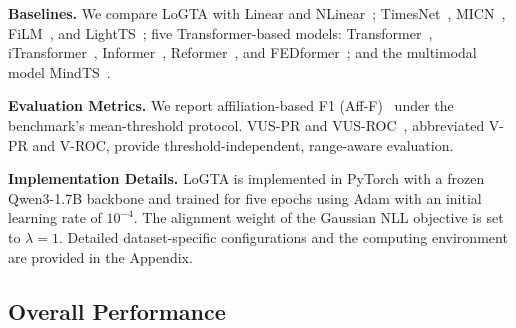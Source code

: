 \documentclass[letterpaper]{article} %
\newcommand{\method}{LoGTA}
\begin{document}
\noindent\textbf{Baselines.}
We compare \method{} with Linear and NLinear~\cite{zeng2023transformers}; TimesNet~\cite{wu2022timesnet}, MICN~\cite{wang2023micn}, FiLM~\cite{zhou2022film}, and LightTS~\cite{zhang2022morefastmultivariatetime}; five Transformer-based models: Transformer~\cite{vaswani2017attention}, iTransformer~\cite{liu2024itransformer}, Informer~\cite{zhou2021informer}, Reformer~\cite{kitaev2020reformer}, and FEDformer~\cite{zhou2022fedformer}; and the multimodal model MindTS~\cite{hu2026towards}.





\noindent\textbf{Evaluation Metrics.}
We report affiliation-based F1 (Aff-F)~\cite{huet2022local} under the benchmark's mean-threshold protocol. VUS-PR and VUS-ROC~\cite{paparrizos2022volume}, abbreviated V-PR and V-ROC, provide threshold-independent, range-aware evaluation.

\noindent\textbf{Implementation Details.}
\method{} is implemented in PyTorch with a frozen Qwen3-1.7B backbone and trained for five epochs using Adam with an initial learning rate of $10^{-4}$. The alignment weight of the Gaussian NLL objective is set to $\lambda=1$. Detailed dataset-specific configurations and the computing environment
are provided in the Appendix.

\subsection{Overall Performance}
\end{document}
